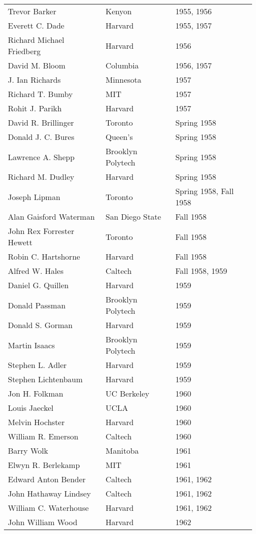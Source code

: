 \documentclass[12pt]{article}
\begin{document}
\begin{tabular}{|l|l|l|}
Trevor Barker & Kenyon & 1955, 1956 \\
Everett C. Dade & Harvard & 1955, 1957 \\
Richard Michael Friedberg & Harvard & 1956 \\
David M. Bloom & Columbia & 1956, 1957 \\
J. Ian Richards & Minnesota & 1957 \\
Richard T. Bumby & MIT & 1957 \\
Rohit J. Parikh & Harvard & 1957 \\
David R. Brillinger & Toronto & Spring 1958 \\
Donald J. C. Bures & Queen's & Spring 1958 \\
Lawrence A. Shepp & Brooklyn Polytech & Spring 1958 \\
Richard M. Dudley & Harvard & Spring 1958 \\
Joseph Lipman & Toronto & Spring 1958, Fall 1958 \\
Alan Gaisford Waterman & San Diego State & Fall 1958 \\
John Rex Forrester Hewett & Toronto & Fall 1958 \\
Robin C. Hartshorne & Harvard & Fall 1958 \\
Alfred W. Hales & Caltech & Fall 1958, 1959 \\
Daniel G. Quillen & Harvard & 1959 \\
Donald Passman & Brooklyn Polytech & 1959 \\
Donald S. Gorman & Harvard & 1959 \\
Martin Isaacs & Brooklyn Polytech & 1959 \\
Stephen L. Adler & Harvard & 1959 \\
Stephen Lichtenbaum & Harvard & 1959 \\
Jon H. Folkman & UC Berkeley & 1960 \\
Louis Jaeckel & UCLA & 1960 \\
Melvin Hochster & Harvard & 1960 \\
William R. Emerson & Caltech & 1960 \\
Barry Wolk & Manitoba & 1961 \\
Elwyn R. Berlekamp & MIT & 1961 \\
Edward Anton Bender & Caltech & 1961, 1962 \\
John Hathaway Lindsey & Caltech & 1961, 1962 \\
William C. Waterhouse & Harvard & 1961, 1962 \\
John William Wood & Harvard & 1962 \\

\end{tabular}
\end{document}
